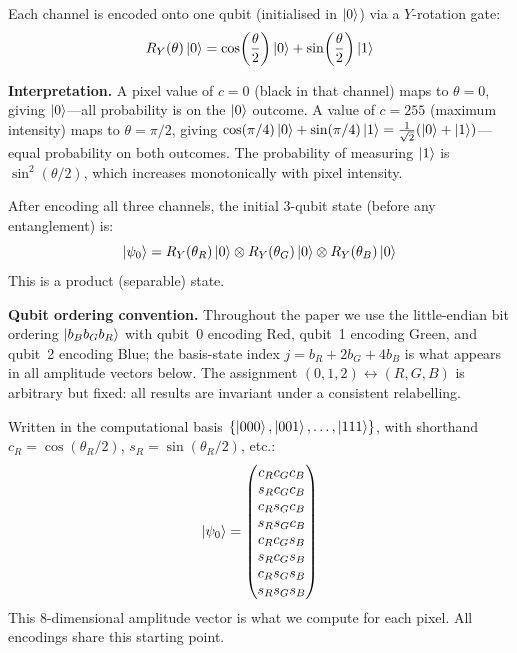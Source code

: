 \documentclass[conference,compsoc]{IEEEtran}
\begin{document}
Each channel is encoded onto one qubit (initialised in $\ket{0}$) via a $Y$-rotation gate:
\begin{equation}
    R_Y(\theta)\ket{0} = \cos\!\left(\frac{\theta}{2}\right)\ket{0} + \sin\!\left(\frac{\theta}{2}\right)\ket{1}
    \label{eq:ry}
\end{equation}

\textbf{Interpretation.}
A pixel value of $c = 0$ (black in that channel) maps to $\theta = 0$, giving $\ket{0}$---all probability is on the $\ket{0}$ outcome.
A value of $c = 255$ (maximum intensity) maps to $\theta = \pi/2$, giving $\cos(\pi/4)\ket{0} + \sin(\pi/4)\ket{1} = \frac{1}{\sqrt{2}}(\ket{0} + \ket{1})$---equal probability on both outcomes.
The probability of measuring $\ket{1}$ is $\sin^2(\theta/2)$, which increases monotonically with pixel intensity.

After encoding all three channels, the initial 3-qubit state (before any entanglement) is:
\begin{equation}
    \ket{\psi_0} = R_Y(\theta_R)\ket{0} \otimes R_Y(\theta_G)\ket{0} \otimes R_Y(\theta_B)\ket{0}
    \label{eq:psi0}
\end{equation}
This is a product (separable) state.

\textbf{Qubit ordering convention.}
Throughout the paper we use the little-endian bit ordering $\ket{b_B b_G b_R}$ with qubit~0 encoding Red, qubit~1 encoding Green, and qubit~2 encoding Blue; the basis-state index $j = b_R + 2 b_G + 4 b_B$ is what appears in all amplitude vectors below.
The assignment $(0,1,2) \leftrightarrow (R,G,B)$ is arbitrary but fixed: all results are invariant under a consistent relabelling.

Written in the computational basis $\{\ket{000}, \ket{001}, \ldots, \ket{111}\}$, with shorthand $c_R = \cos(\theta_R/2)$, $s_R = \sin(\theta_R/2)$, etc.:
\begin{equation}
    \ket{\psi_0} = \begin{pmatrix} c_R c_G c_B \\ s_R c_G c_B \\ c_R s_G c_B \\ s_R s_G c_B \\ c_R c_G s_B \\ s_R c_G s_B \\ c_R s_G s_B \\ s_R s_G s_B \end{pmatrix}
    \label{eq:sep_vector}
\end{equation}
This 8-dimensional amplitude vector is what we compute for each pixel.
All encodings share this starting point.
\end{document}
